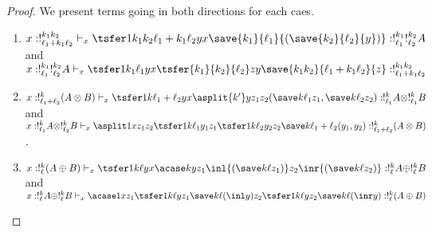 \fusion*
\begin{proof}
We present terms going in both directions for each caes.
\begin{enumerate}
  \item $x : !^{k_1k_2}_{\ell_1 + k_1\ell_2} \vdash_x \tsfer 1 {k_1k_2} {\ell_1 + k_1\ell_2} y x {\save {k_1} {\ell_1} {(\save {k_2} {\ell_2} {y})}} : !^{k_1}_{\ell_1} !^{k_2}_{\ell_2} A$ and $x : !^{k_1}_{\ell_1} !^{k_2}_{\ell_2} A \vdash_x \tsfer 1 {k_1} {\ell_1} y x {\tsfer {k_1} {k_2} {\ell_2} z y {\save {k_1k_2} {\ell_1 + k_1\ell_2} {z}}} : !^{k_1k_2}_{\ell_1 + k_1\ell_2}$
  
  \item $x : !^k_{\ell_1 + \ell_2}(A \otimes B) \vdash_x \tsfer 1 k {\ell_1 + \ell_2} y x {\asplit {k'} y {z_1} {z_2} {(\save k {\ell_1} {z_1}, \save k {\ell_2} {z_2})}} : !^k_{\ell_1} A \otimes !^k_{\ell_1} B$ and $x : !^k_{\ell_1} A \otimes !^k_{\ell_2} B \vdash_x \asplit 1 x {z_1} {z_2} {\tsfer 1 k {\ell_1} {y_1} {z_1} {\tsfer 1 k {\ell_2} {y_2} {z_2} {\save k {\ell_1 + \ell_2} (y_1,y_2)}}} : !^k_{\ell_1 + \ell_2}(A \otimes B)$.
  
  \item $x : !^k_\ell (A \oplus B) \vdash_x \tsfer 1 k {\ell} y x {\acase k y {z_1} {\inl {(\save k \ell {z_1})}} {z_2} {\inr {(\save k \ell {z_2})}}} : !^k_\ell A \oplus !^k_\ell B$ and $x : !^k_\ell A \oplus !^k_\ell B \vdash_x \acase 1 x {z_1} {\tsfer 1 k {\ell} y {z_1} {\save k \ell {(\inl y)}}} {z_2} {\tsfer 1 k {\ell} y {z_2} {\save k \ell {(\inr y)}}} : !^k_\ell (A \oplus B)$
\end{enumerate}
\end{proof}